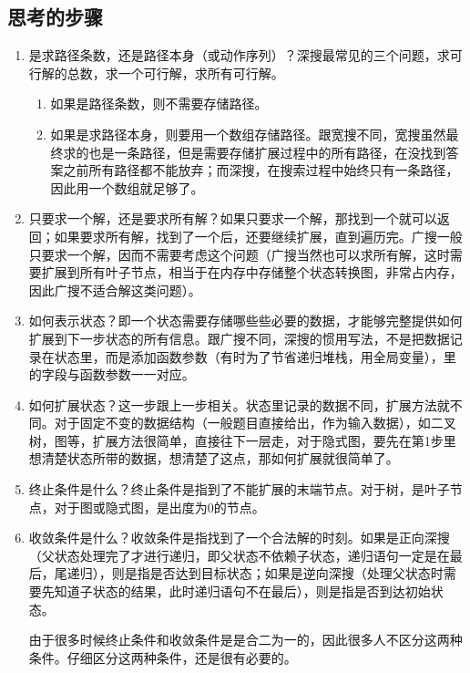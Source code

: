\subsection{思考的步骤}
\begin{enumerate}
\item 是求路径条数，还是路径本身（或动作序列）？深搜最常见的三个问题，求可行解的总数，求一个可行解，求所有可行解。
    \begin{enumerate}
	\item 如果是路径条数，则不需要存储路径。
    \item 如果是求路径本身，则要用一个数组存储路径。跟宽搜不同，宽搜虽然最终求的也是一条路径，但是需要存储扩展过程中的所有路径，在没找到答案之前所有路径都不能放弃；而深搜，在搜索过程中始终只有一条路径，因此用一个数组就足够了。
    \end{enumerate}

\item 只要求一个解，还是要求所有解？如果只要求一个解，那找到一个就可以返回；如果要求所有解，找到了一个后，还要继续扩展，直到遍历完。广搜一般只要求一个解，因而不需要考虑这个问题（广搜当然也可以求所有解，这时需要扩展到所有叶子节点，相当于在内存中存储整个状态转换图，非常占内存，因此广搜不适合解这类问题）。

\item 如何表示状态？即一个状态需要存储哪些些必要的数据，才能够完整提供如何扩展到下一步状态的所有信息。跟广搜不同，深搜的惯用写法，不是把数据记录在状态里，而是添加函数参数（有时为了节省递归堆栈，用全局变量），里的字段与函数参数一一对应。

\item 如何扩展状态？这一步跟上一步相关。状态里记录的数据不同，扩展方法就不同。对于固定不变的数据结构（一般题目直接给出，作为输入数据），如二叉树，图等，扩展方法很简单，直接往下一层走，对于隐式图，要先在第1步里想清楚状态所带的数据，想清楚了这点，那如何扩展就很简单了。

\item 终止条件是什么？终止条件是指到了不能扩展的末端节点。对于树，是叶子节点，对于图或隐式图，是出度为0的节点。

\item {收敛条件是什么？收敛条件是指找到了一个合法解的时刻。如果是正向深搜（父状态处理完了才进行递归，即父状态不依赖子状态，递归语句一定是在最后，尾递归），则是指是否达到目标状态；如果是逆向深搜（处理父状态时需要先知道子状态的结果，此时递归语句不在最后），则是指是否到达初始状态。

由于很多时候终止条件和收敛条件是是合二为一的，因此很多人不区分这两种条件。仔细区分这两种条件，还是很有必要的。

}
\end{enumerate}
